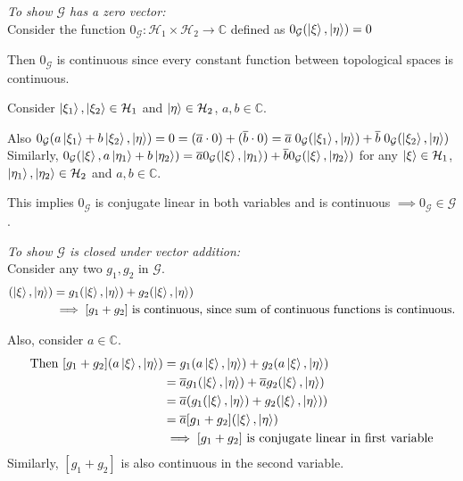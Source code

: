 \documentclass[12pt,twoside,fleqn]{report}
\makeatletter
\theoremstyle{thmstyle}
\renewenvironment{proof}[1][\proofname]{\par
\pushQED{\qed}%
\normalfont \topsep6\p@\@plus6\p@\relax
\trivlist
\item[\hskip\labelsep\itshape#1\@addpunct{.}]\mbox{}\par\nobreak\ignorespaces
}{%
    \popQED\endtrivlist\@endpefalse
    }
\makeatother
\begin{document}
\begin{proof}
    \emph{To show $\mathcal{G}$ has a zero vector:} \\

    Consider the function $0_\mathcal{G}: \mathcal{H}_1 \times \mathcal{H}_2 \to \mathbb{C}$ defined as $0_\mathcal{G}(\ket{\xi}, \ket{\eta}) = 0$

    Then $0_\mathcal{G}$ is continuous since every constant function between topological spaces is continuous.

    Consider $\ket{\xi_1}, \ket{\xi_2} \in \mathcal{H}_1$ and $\ket{\eta} \in \mathcal{H}_2$, $a,b \in \mathbb{C}$.

    Also $0_\mathcal{G}(a \ket{\xi_1} + b \ket{\xi_2}, \ket{\eta}) = 0 = (\overline{a} \cdot 0 ) + (\overline{b} \cdot 0) = \overline{a} \; 0_\mathcal{G}(\ket{\xi_1}, \ket{\eta}) + \overline{b} \; 0_\mathcal{G} (\ket{\xi_2}, \ket{\eta}) $
    Similarly, $0_\mathcal{G}(\ket{\xi}, a \ket{\eta_1} + b \ket{\eta_2}) = \overline{a} 0_\mathcal{G}(\ket{\xi}, \ket{\eta_1}) + \overline{b} 0_\mathcal{G}(\ket{\xi}, \ket{\eta_2})$ for any $\ket{\xi} \in \mathcal{H}_1$, $\ket{\eta_1}, \ket{\eta_2} \in \mathcal{H}_2$ and $a,b \in \mathbb{C}$.

    This implies $0_\mathcal{G}$ is conjugate linear in both variables and is continuous $\implies 0_\mathcal{G} \in \mathcal{G}$ .

    \emph{To show $\mathcal{G}$ is closed under vector addition:}\\

    Consider any two $g_1, g_2$ in $\mathcal{G}$.
    \begin{align*}
        [g_1 + g_2](\ket\xi, \ket\eta) & = g_1(\ket\xi, \ket\eta) + g_2(\ket\xi, \ket\eta)
        \\ & \implies [g_1 + g_2] \text{ is continuous, since sum of continuous functions is continuous.}
    \end{align*}

    Also, consider $a \in \mathbb{C}$.
    \begin{align*}
        \text{Then }[g_1 + g_2](a \ket\xi, \ket\eta) & = g_1(a \ket\xi, \ket\eta) + g_2(a \ket\xi, \ket\eta)
        \\ & = \overline{a} g_1(\ket\xi, \ket\eta) + \overline{a} g_2(\ket\xi, \ket\eta)
        \\ & = \overline{a} (g_1(\ket\xi, \ket\eta) + g_2(\ket\xi,\ket\eta))
        \\ & = \overline{a}[g_1 + g_2](\ket\xi, \ket\eta)
        \\ & \implies [g_1 + g_2] \text{ is conjugate linear in first variable}
    \end{align*}
    Similarly, $[g_1 + g_2]$ is also continuous in the second variable.


\end{proof}
\end{document}
